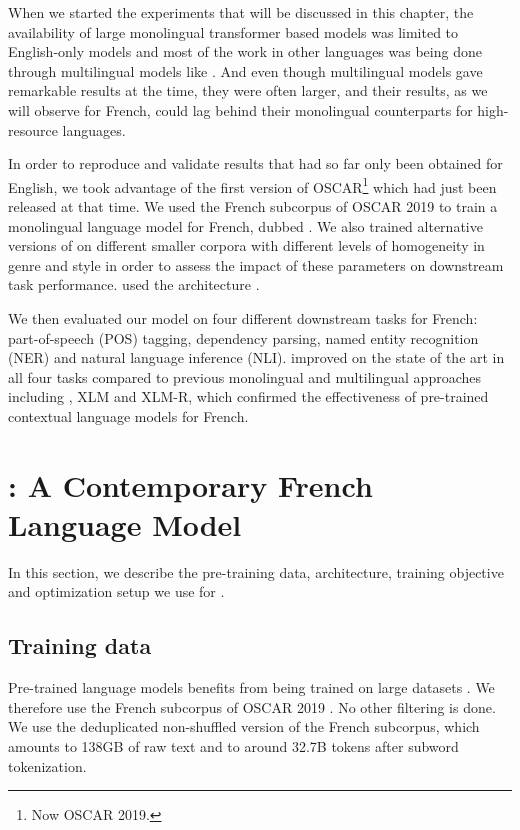 When we started the experiments that will be discussed in this chapter, the availability of large monolingual transformer based models was limited to English-only models \citep{devlin-etal-2019-bert,radford-etal-2019-language,liu-etal-2019-roberta,yang-etal-2019-xlnet,raffel-etal-2020-exploring} and most of the work in other languages was being done through multilingual models like \mbert \citep{devlin-etal-2019-bert}. And even though multilingual models gave remarkable results at the time, they were often larger, and their results, as we will observe for French, could lag behind their monolingual counterparts for high-resource languages.

In order to reproduce and validate results that had so far only been obtained for English, we took advantage of the first version of OSCAR\footnote{Now OSCAR 2019.} \citep{ortiz-suarez-etal-2019-asynchronous} which had just been released at that time. We used the French subcorpus of OSCAR 2019 to train a monolingual language model for French, dubbed \camembert. We also trained alternative versions of \camembert on different smaller corpora with different levels of homogeneity in genre and style in order to assess the impact of these parameters on downstream task performance.
\camembert used the \roberta architecture \citep{liu-etal-2019-roberta}.

We then evaluated our model on four different downstream tasks for French: part-of-speech (POS) tagging, dependency parsing, named entity recognition (NER) and natural language inference (NLI). \camembert improved on the state of the art in all four tasks compared to previous monolingual and multilingual approaches including \mbert, XLM and XLM-R, which confirmed the effectiveness of pre-trained contextual language models for French.

\section{\camembert: A Contemporary French Language Model}\label{sec:Camembert}
In this section, we describe the pre-training data, architecture, training objective and optimization setup we use for \camembert.

\subsection{Training data}
Pre-trained language models benefits from being trained on large datasets \citep{devlin-etal-2019-bert,liu-etal-2019-roberta,raffel-etal-2020-exploring}. We therefore use the French subcorpus of OSCAR 2019 \citep{ortiz-suarez-etal-2019-asynchronous,ortiz-suarez-etal-2020-monolingual}. No other filtering is done. We use the deduplicated non-shuffled version of the French subcorpus, which amounts to 138GB of raw text and to around 32.7B tokens after subword tokenization.

